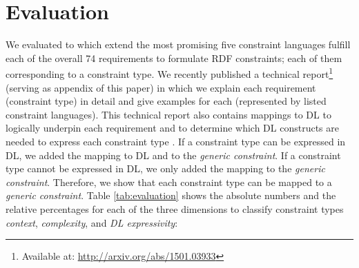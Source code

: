 \documentclass{llncs}
\newenvironment{evaluation-generic-overview}{
  \vspace{0cm}
	\begin{center}
  \begin{tabular}{l|c|c}
  \hline
  \textbf{Constraint Classes} & \textbf{\#} & \textbf{\%} \\
  \hline

}{
  \hline
  \end{tabular}
	\end{center}
}
\begin{document}

\section{Evaluation}
\label{sec:evaluation}

We evaluated to which extend the most promising five constraint languages fulfill each of the overall 74 requirements to formulate RDF constraints; each of them corresponding to a constraint type.
We recently published a technical report\footnote{Available at: \url{http://arxiv.org/abs/1501.03933}} (serving as appendix of this paper) in which we explain each requirement (constraint type) in detail and give examples for each (represented by listed constraint languages).
This technical report also contains mappings to DL to logically underpin each requirement and to determine which DL constructs are needed to express each constraint type \cite{BoschNolleAcarEckert2015}.
If a constraint type can be expressed in DL, we added the mapping to DL and to the \emph{generic constraint}.
If a constraint type cannot be expressed in DL, we only added the mapping to the \emph{generic constraint}.
Therefore, we show that each constraint type can be mapped to a \emph{generic constraint}.
Table \ref{tab:evaluation} shows the absolute numbers and the relative percentages for each of the three dimensions to classify constraint types \emph{context}, \emph{complexity}, and \emph{DL expressivity}:

\end{document}

